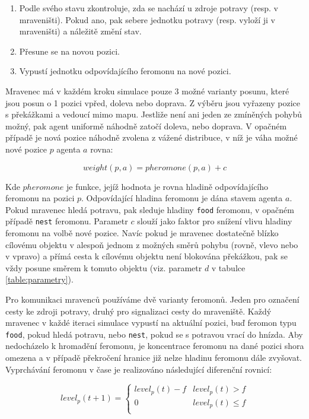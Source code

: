 \documentclass[10pt,a4paper,twocolumn]{article}
\begin{document}
\begin{enumerate}
  \item Podle svého stavu zkontroluje, zda se nachází u zdroje potravy 
  (resp. v mraveništi). Pokud ano, pak sebere jednotku potravy 
  (resp. vyloží ji v mraveništi) a náležitě změní stav.
  \item Přesune se na novou pozici.
  \item Vypustí jednotku odpovídajícího feromonu na nové pozici.
\end{enumerate}

Mravenec má v každém kroku simulace pouze 3 možné varianty posunu, které 
jsou posun o 1 pozici vpřed, doleva nebo doprava. Z výběru jsou vyřazeny
pozice s překážkami a vedoucí mimo mapu. Jestliže není ani jeden ze zmíněných 
pohybů možný, pak agent uniformě náhodně zatočí doleva, nebo
doprava. V opačném případě je nová pozice náhodně zvolena z vážené distribuce, 
v níž je váha možné nové pozice $p$ agenta $a$ rovna:

\begin{equation}
  weight(p, a) = pheromone(p, a) + c
\end{equation}

Kde $pheromone$ je funkce, jejíž hodnota je rovna hladině odpovídajícího 
feromonu na pozici $p$. Odpovídající hladina feromonu je dána stavem agenta $a$.
Pokud mravenec hledá potravu, pak sleduje hladiny \texttt{food}
feromonu, v opačném případě \texttt{nest} feromonu.
Parametr $c$ slouží jako faktor pro snížení vlivu hladiny feromonu na volbě
nové pozice. Navíc pokud je mravenec dostatečně blízko cílovému objektu
v alespoň jednom z možných směrů pohybu (rovně, vlevo nebo v vpravo) a přímá
cesta k cílovému objektu není blokována překážkou, pak se vždy posune 
směrem k tomuto objektu (viz. parametr $d$ v tabulce \ref{table:parametry}). 

Pro komunikaci mravenců používáme dvě varianty feromonů. Jeden pro označení 
cesty ke zdroji potravy, druhý pro signalizaci cesty do mraveniště. 
Každý mravenec v každé iteraci simulace vypustí na aktuální pozici, buď feromon typu
\texttt{food}, pokud hledá potravu, nebo \texttt{nest}, pokud se s potravou
vrací do hnízda. Aby nedocházelo k hromadění feromonu, je koncentrace feromonu
na dané pozici shora omezena a v případě překročení hranice již nelze hladinu
feromonu dále zvyšovat. Vyprchávání feromonu v čase je realizováno následující 
diferenční rovnicí:

\begin{equation}
  level_{p}(t+1) = 
  \left\{
    \begin{array}{ll}
      level_{p}(t) - f  & level_{p}(t) > f \\
      0 & level_{p}(t) \leq f \\ 
    \end{array}
  \right.
\end{equation}
\end{document}
